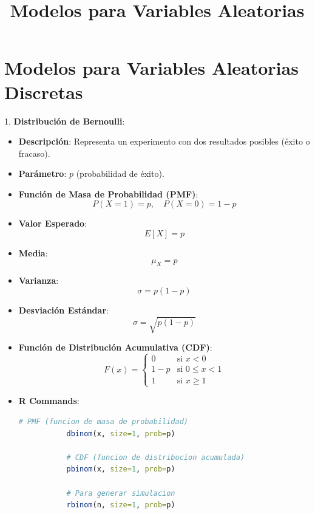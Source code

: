 \documentclass{article}
\title{\Huge Modelos para Variables Aleatorias}
\author{}
\date{}
\begin{document}
\maketitle

\section*{\Large Modelos para Variables Aleatorias Discretas}

1. \textbf{\Large{Distribución de Bernoulli}}:
   \begin{itemize}
       \item \textbf{Descripción}: Representa un experimento con dos resultados posibles (éxito o fracaso).
       \item \textbf{Parámetro}: \( p \) (probabilidad de éxito).
       \item \textbf{Función de Masa de Probabilidad (PMF)}:
       \[
       P(X=1) = p, \quad P(X=0) = 1 - p
       \]
       \item \textbf{Valor Esperado}:
       \[
       E[X] = p
       \]
       \item \textbf{Media}:
       \[
       \mu_X = p
       \]
        \item \textbf{Varianza}:
       \[
       \sigma = p(1-p)
       \]
       \item \textbf{Desviación Estándar}:
       \[
       \sigma = \sqrt{p(1-p)}
       \]
       \item \textbf{Función de Distribución Acumulativa (CDF)}:
       \[
       F(x) = 
       \begin{cases} 
       0 & \text{si } x < 0 \\ 
       1 - p & \text{si } 0 \leq x < 1 \\ 
       1 & \text{si } x \geq 1 
       \end{cases}
       \]
       \item \textbf{R Commands}:
      
           \begin{lstlisting}[style=colored, language=R]
           # PMF (funcion de masa de probabilidad)
           dbinom(x, size=1, prob=p)
           
           # CDF (funcion de distribucion acumulada)
           pbinom(x, size=1, prob=p)
           
           # Para generar simulacion
           rbinom(n, size=1, prob=p)       
          \end{lstlisting}
       
   \end{itemize}
\end{document}

